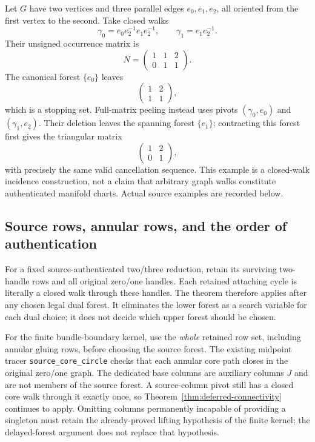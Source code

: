 Let $G$ have two vertices and three parallel edges $e_0,e_1,e_2$, all
oriented from the first vertex to the second.  Take closed walks
\[
 \gamma_0=e_0e_2^{-1}e_1e_2^{-1},\qquad
 \gamma_1=e_1e_2^{-1}.
\]
Their unsigned occurrence matrix is
\[
 N=\begin{pmatrix}1&1&2\\0&1&1\end{pmatrix}.
\]
The canonical forest $\{e_0\}$ leaves
\[
 \begin{pmatrix}1&2\\1&1\end{pmatrix},
\]
which is a stopping set.  Full-matrix peeling instead uses pivots
$(\gamma_0,e_0)$ and $(\gamma_1,e_2)$.  Their deletion leaves the spanning
forest $\{e_1\}$; contracting this forest first gives the triangular
matrix
\[
 \begin{pmatrix}1&2\\0&1\end{pmatrix},
\]
with precisely the same valid cancellation sequence.  This example is a
closed-walk incidence construction, not a claim that arbitrary graph
walks constitute authenticated manifold charts.  Actual source examples
are recorded below.

\subsection{Source rows, annular rows, and the order of authentication}

For a fixed source-authenticated two/three reduction, retain its surviving
two-handle rows and all original zero/one handles.  Each retained attaching
cycle is literally a closed walk through these handles.  The theorem
therefore applies after any chosen legal dual forest.  It eliminates the
lower forest as a search variable for each dual choice; it does not decide
which upper forest should be chosen.

For the finite bundle-boundary kernel, use the \emph{whole} retained row
set, including annular gluing rows, before choosing the source forest.
The existing midpoint tracer \texttt{source\_core\_circle} checks that
each annular core path closes in the original zero/one graph.  The
dedicated base columns are auxiliary columns $J$ and are not members of
the source forest.  A source-column pivot still has a closed core walk
through it exactly once, so Theorem~\ref{thm:deferred-connectivity}
continues to apply.  Omitting columns permanently incapable of providing a
singleton must retain the already-proved lifting hypothesis of the finite
kernel; the delayed-forest argument does not replace that hypothesis.

